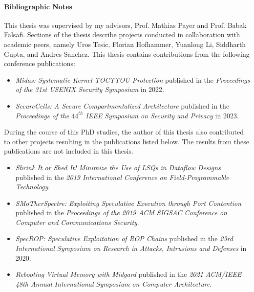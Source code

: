 \paragraph{Bibliographic Notes}
This thesis was supervised by my advisors, Prof. Mathias Payer and Prof. Babak Falsafi.
Sections of the thesis describe projects conducted in collaboration with academic peers, 
namely Uros Tesic, Florian Hofhammer, Yuanlong Li, Siddharth Gupta, and Andres Sanchez.
This thesis contains contributions from the following conference publications:
\begin{itemize}
      \item \emph{Midas: Systematic Kernel TOCTTOU Protection} published in
            the 
            \emph{Proceedings of the 31st USENIX Security Symposium} in 2022.
      \item \emph{SecureCells: A Secure Compartmentalized Architecture} published in
            the 
            \emph{Proceedings of the $44^{th}$ IEEE Symposium on Security and Privacy} 
            in 2023.
\end{itemize}

During the course of this PhD studies, the author of this thesis also contributed to
other projects resulting in the publications listed below.
The results from these publications are not included in this thesis.
\begin{itemize}
      \item \emph{Shrink It or Shed It! Minimize the Use of LSQs in Dataflow Designs}
            published in the
            \emph{2019 International Conference on Field-Programmable Technology}.
      \item \emph{SMoTherSpectre: Exploiting Speculative Execution through Port Contention}
            published in the
            \emph{Proceedings of the 2019 ACM SIGSAC Conference on Computer and Communications Security}.
      \item \emph{SpecROP: Speculative Exploitation of ROP Chains}
            published in the
            \emph{23rd International Symposium on Research in Attacks, Intrusions and Defenses}
            in 2020.
      \item \emph{Rebooting Virtual Memory with Midgard}
            published in the
            \emph{2021 ACM/IEEE 48th Annual International Symposium on Computer Architecture}.
\end{itemize}

